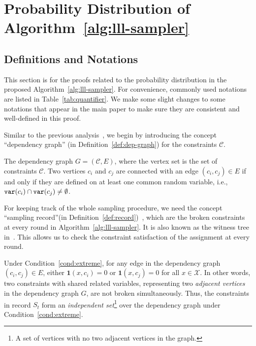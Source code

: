 
\newpage
\onecolumn


\section{Probability Distribution  of Algorithm~\ref{alg:lll-sampler}}\label{appendix:prob-dist}
\subsection{Definitions and Notations}
This section is for the proofs related to the probability distribution in the proposed Algorithm~\ref{alg:lll-sampler}. For convenience, commonly used notations are listed in Table~\ref{tab:quantifier}. We make some slight changes to some notations that appear in the main paper to make sure they are consistent and well-defined in this proof.



Similar to the previous analysis~\cite{DBLP:journals/jacm/GuoJL19,DBLP:journals/arxiv/jerrum2021}, we begin by introducing the concept ``dependency graph'' (in Definition~\ref{def:dep-graph}) for the constraints $\mathcal{C}$. 


\begin{definition} \label{def:dep-graph}
The dependency graph $G=(\mathcal{C},E)$, where the vertex set is the set of constraints $\mathcal{C}$.  Two vertices $c_i$ and $c_j$ are connected with an edge $(c_i,c_j)\in E$ if and only if they are defined on at least one common random variable, i.e., $\mathtt{var}(c_i)\cap\mathtt{var}(c_j) \neq \emptyset$. 
\end{definition}



For keeping track of the whole sampling procedure, we need the concept ``sampling record''(in Definition~\ref{def:record})~\cite{DBLP:journals/jacm/GuoJL19}, which are the broken constraints at every round in Algorithm~\ref{alg:lll-sampler}. It is also known as the witness tree in~\citet{DBLP:journals/jacm/MoserT10}.  This allows us to check the constraint satisfaction of the assignment at every round.

Under Condition~\ref{cond:extreme}, for any edge in the dependency graph $(c_i,c_j) \in E$,   either $\mathbf{1}(x,c_i)=0$ or $\mathbf{1}(x,c_j)=0$ for all $x\in \mathcal{X}$.
In other words, two constraints with shared related variables, representing two \textit{adjacent vertices} in the dependency graph $G$, are not broken simultaneously. Thus, the constraints in record $S_t$ form an \textit{independent set}\footnote{A set of vertices with no two adjacent vertices in the graph.} over the dependency graph under Condition~\ref{cond:extreme}.

